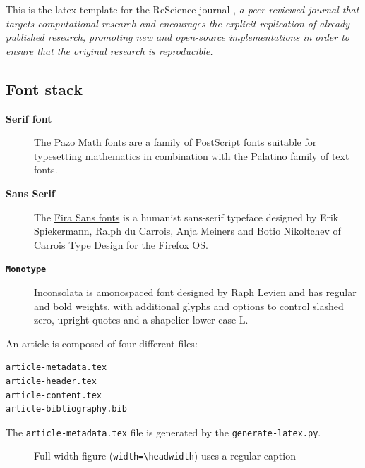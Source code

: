 \documentclass[a4paper,10pt]{article}
\newcommand{\sidecite}[1]{\marginpar{\sf\scriptsize\fullcite{#1}}}
\begin{document}
This is the latex template for the ReScience journal
\citep{Rougier:2017}\sidecite{Rougier:2017}, {\em a peer-reviewed
journal that targets computational research and encourages the explicit
replication of already published research, promoting new and open-source
implementations in order to ensure that the original research is
reproducible.}\\

\subsection*{Font stack}
\begin{description}
\item[{\bfseries Serif font}] The
  \href{http://www.tug.dk/FontCatalogue/urwpalladio}{Pazo Math fonts} are a
  family of PostScript fonts suitable for typesetting mathematics in
  combination with the Palatino family of text fonts.
\item[{\sf \bfseries Sans Serif}] The
  \href{http://www.tug.dk/FontCatalogue/firasans/}{Fira Sans fonts} is a
  humanist sans-serif typeface designed by Erik Spiekermann, Ralph du Carrois,
  Anja Meiners and Botio Nikoltchev of Carrois Type Design for the Firefox OS.
\item[{\tt \bfseries Monotype}]
  \href{http://www.tug.dk/FontCatalogue/inconsolata/}{Inconsolata} is
  amonospaced font designed by Raph Levien and has regular and bold weights,
  with additional glyphs and options to control slashed zero, upright quotes
  and a shapelier lower-case L.
\end{description}

An article is composed of four different files:
\begin{lstlisting}
article-metadata.tex
article-header.tex
article-content.tex
article-bibliography.bib
\end{lstlisting}


The {\tt article-metadata.tex} file is generated by the {\tt generate-latex.py}.\\

\begin{minipage}{\headwidth}
  \em \lipsum[1]
\end{minipage}


\begin{figure}[htbp]
  \caption{Full width figure ({\tt width=\textbackslash headwidth}) uses a
    regular caption}
  \label{fig:1}
\end{figure}
\end{document}
